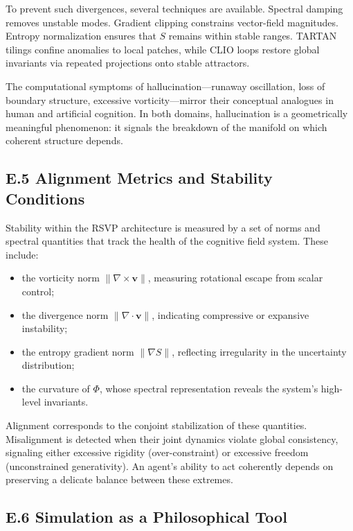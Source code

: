 \documentclass[12pt]{article}
\begin{document}
To prevent such divergences, several techniques are available.  
Spectral damping removes unstable modes.  
Gradient clipping constrains vector-field magnitudes.  
Entropy normalization ensures that $S$ remains within stable ranges.  
TARTAN tilings confine anomalies to local patches, while CLIO loops restore 
global invariants via repeated projections onto stable attractors.

The computational symptoms of hallucination—runaway oscillation, loss of 
boundary structure, excessive vorticity—mirror their conceptual analogues in 
human and artificial cognition.  
In both domains, hallucination is a geometrically meaningful phenomenon: it 
signals the breakdown of the manifold on which coherent structure depends.

\subsection*{E.5 Alignment Metrics and Stability Conditions}

Stability within the RSVP architecture is measured by a set of norms and 
spectral quantities that track the health of the cognitive field system.  
These include:

\begin{itemize}
\item the vorticity norm $\|\nabla \times \mathbf{v}\|$, measuring rotational 
escape from scalar control;
\item the divergence norm $\|\nabla \cdot \mathbf{v}\|$, indicating compressive 
or expansive instability;
\item the entropy gradient norm $\|\nabla S\|$, reflecting irregularity in 
the uncertainty distribution;
\item the curvature of $\Phi$, whose spectral representation reveals 
the system’s high-level invariants.
\end{itemize}

Alignment corresponds to the conjoint stabilization of these quantities.  
Misalignment is detected when their joint dynamics violate global consistency, 
signaling either excessive rigidity (over-constraint) or excessive freedom 
(unconstrained generativity).  
An agent’s ability to act coherently depends on preserving a delicate balance 
between these extremes.

\subsection*{E.6 Simulation as a Philosophical Tool}
\end{document}
